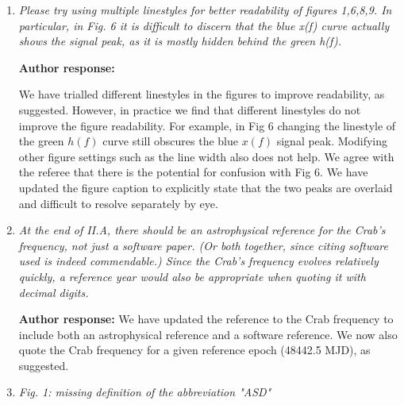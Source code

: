 \documentclass[10pt]{article}
\begin{document}
\begin{enumerate}
			\textbf{Author response:}  \newline 
			Yes we agree with the referee that the previous statement was imprecise.
			
			We have updated the paragraph to better describe the vetoing procedures for standard CW pipelines (e.g. \textit{FrequencyHough}, \textit{SkyHough}, see arXiv 2201.00697) and discuss ``line robust" algorithms, which combine statistics from different detectors to suppress single detector artifacts (e.g. Keitel et al. 2015, Keitel 2016a,b). 

	\item \textit{Please try using multiple linestyles for better readability of figures  
		1,6,8,9. In particular, in Fig. 6 it is difficult to discern that the blue x(f)  
		curve actually shows the signal peak, as it is mostly hidden behind the green  
		h(f).  }
	
	\textbf{Author response:}  \newline 
	
	We have trialled different linestyles in the figures to improve readability, as suggested. However, in practice we find that different linestyles do not improve the figure readability. For example, in Fig 6 changing the linestyle of the green $h(f)$ curve still obscures the blue $x(f)$ signal peak. Modifying other figure settings such as the line width also does not help. We agree with the referee that there is the potential for confusion with Fig 6. We have updated the figure caption to explicitly state that the two peaks are overlaid and difficult to resolve separately by eye.
	
	
	
	
	\item \textit{At the end of II.A, there should be an astrophysical reference for the Crab's  
		frequency, not just a software paper. (Or both together, since citing software  
		used is indeed commendable.) Since the Crab's frequency evolves relatively  
		quickly, a reference year would also be appropriate when quoting it with decimal  
		digits. }
	
	
		\textbf{Author response:}  \newline 
		We have updated the reference to the Crab frequency to include both an astrophysical reference and a software reference. We now also quote the Crab frequency for a given reference epoch (48442.5 MJD), as suggested.
	
	\item \textit{Fig. 1: missing definition of the abbreviation "ASD"  }
	

\end{enumerate}
\end{document}
